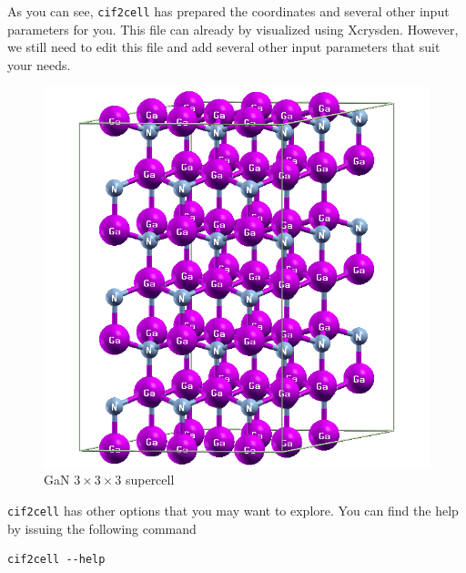 \documentclass[12pt,english]{paper}
\begin{document}
As you can see, \texttt{cif2cell} has prepared the coordinates and
several other input parameters for you. This file can already by visualized
using Xcrysden. However, we still need to edit this file and add several
other input parameters that suit your needs.

\begin{figure}[H]
\noindent \begin{centering}
\includegraphics[scale=0.3]{images/GaN_3x3x3}
\par\end{centering}

\caption{GaN $3\times3\times3$ supercell}


\end{figure}


\texttt{cif2cell} has other options that you may want to explore.
You can find the help by issuing the following command

\begin{lstlisting}
cif2cell --help
\end{lstlisting}




\end{document}
